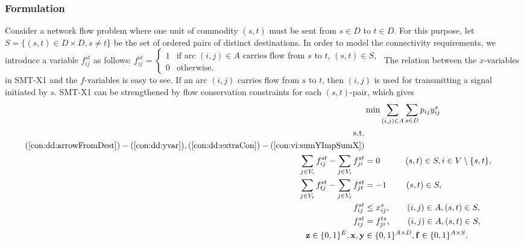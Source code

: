 \subsubsection{Formulation}
\label{sec:smtx2:form}
Consider a network flow problem where one unit of commodity $(s,t)$ must be sent from $s\in D$ to $t\in D$. For this purpose, let $S=\{(s,t)\in D\times D, s\neq t\}$ be the set of ordered pairs of distinct destinations. In order to model the connectivity requirements, we introduce a variable $f^{st}_{ij}$ as follows:
\newline\newline
  $f_{ij}^{st}=
	\begin{cases}
    1 & \text{if arc $(i,j) \in A$ carries flow from $s$ to $t$, $(s,t)\in S$},\\
    0 & \text{otherwise}.
  \end{cases}$
\newline\newline
The relation between the $x$-variables in SMT-X1 and the $f$-variables is easy to see. If an arc $(i,j)$ carries flow from $s$ to $t$, then $(i,j)$ is used for transmitting a signal initiated by $s$.
SMT-X1 can be strengthened by flow conservation constraints for each $(s,t)$-pair, which gives 
\newline
\newline  
\begin{subequations}\label{eq:smt-x2}
\begin{flalign}
\label{objective:dd} \makebox[0pt][l]{$\displaystyle{} \min \sum\limits_{(i,j) \in A} \sum\limits_{s \in D} p_{ij} y^s_{ij} $}  \\ 
\text{s.t.}    \notag   \\	
(\ref{con:dd:arrowFromDest}) - (\ref{con:dd:yvar}), (\ref{con:dd:extraCon}) -  (\ref{con:vi:sumYImpSumX}) \notag \\ 
 \label{con:mf:flowNormal}  \sum\limits_{\substack{ j\in V_i}}f^{st}_{ij}-\sum\limits_{\substack{j\in V_i }}f^{st}_{ji}    & = 0   \quad \quad\quad 			  (s,t)\in S, i\in V\setminus\{s,t\}, &\\	
\label{con:mf:flowDest}  \sum\limits_{\substack{ j\in V_t }}f^{st}_{tj}-\sum\limits_{\substack{j\in V_t}}f^{st}_{jt}    & = -1  \quad\quad ~ (s,t)\in S, &\\	
 \label{con:mf:fcap}   f^{st}_{ij} &\leq  x^{s}_{ij},\quad\quad    (i,j)\in A, (s,t)\in S, & \\ 		 			 	 
 \label{con:mf:fsym}   f^{st}_{ij} &=  f^{ts}_{ji},  \quad\quad(i,j)\in A, (s,t)\in S, &\\   
\label{con:mf:xydim}	\mathbf{z} \in \{0,1\}^{E}, \mathbf{x},\mathbf{y} &\in \{0,1\}^{A\times D},  \mathbf{f}\in\{0,1\}^{A\times S}. 
\end{flalign}~
\end{subequations}  
